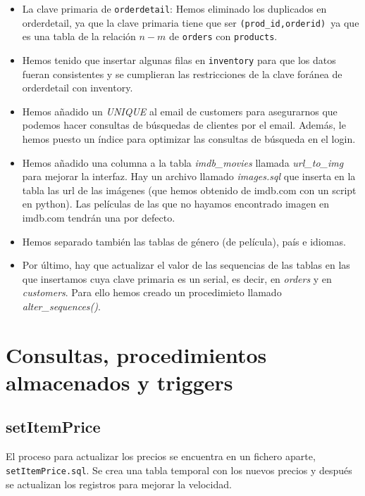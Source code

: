 \documentclass[nochap]{apuntes}
\begin{document}
\begin{itemize}

\item La clave primaria de \texttt{orderdetail}: Hemos eliminado los duplicados en orderdetail, ya que la clave primaria tiene que ser \texttt{(prod\_id,orderid) }ya que es una tabla de la relación $n-m$ de \texttt{orders} con \texttt{products}.

\item Hemos tenido que insertar algunas filas en \texttt{inventory} para que los datos fueran consistentes y se cumplieran las restricciones de la clave foránea de orderdetail con inventory.

\item Hemos añadido un \textit{UNIQUE} al email de customers para asegurarnos que podemos hacer consultas de búsquedas de clientes por el email. Además, le hemos puesto un índice para optimizar las consultas de búsqueda en el login.

\item Hemos añadido una columna a la tabla \textit{imdb\_movies} llamada \textit{url\_to\_img} para mejorar la interfaz. Hay un archivo llamado \textit{images.sql} que inserta en la tabla las url de las imágenes (que hemos obtenido de imdb.com con un script en python). Las películas de las que no hayamos encontrado imagen en imdb.com tendrán una por defecto.

\item Hemos separado también las tablas de género (de película), país e idiomas.

\item Por último, hay que actualizar el valor de las sequencias de las tablas en las que insertamos cuya clave primaria es un serial, es decir, en \textit{orders} y en \textit{customers}. Para ello hemos creado un procedimieto llamado \textit{alter\_sequences()}.
\end{itemize}



\section{Consultas, procedimientos almacenados y triggers}
\subsection{setItemPrice}
El proceso para actualizar los precios se encuentra en un fichero aparte, \texttt{setItemPrice.sql}. Se crea una tabla temporal con los nuevos precios y después se actualizan los registros para mejorar la velocidad.
\end{document}
